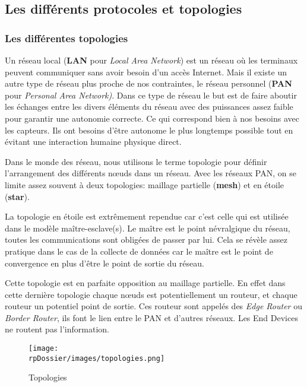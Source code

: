
\subsection{Les différents protocoles et topologies}

\subsubsection{Les différentes topologies}

Un réseau local (\textbf{LAN} pour \textit{Local Area Network}) est un réseau où les terminaux peuvent communiquer sans avoir besoin d'un accès Internet. Mais il existe un autre type de réseau plus proche de nos contraintes, le réseau personnel (\textbf{PAN} pour \textit{Personal Area Network)}. Dans ce type de réseau le but est de faire aboutir les échanges entre les divers éléments du réseau avec des puissances assez faible pour garantir une autonomie correcte. Ce qui correspond bien à nos besoins avec les capteurs. Ils ont besoins d'être autonome le plus longtemps possible tout en évitant une interaction humaine physique direct. 

Dans le monde des réseau, nous utilisons le terme topologie pour définir l'arrangement des différents nœuds dans un réseau. Avec les réseaux PAN, on se limite assez souvent à deux topologies: maillage partielle (\textbf{mesh}) et en étoile (\textbf{star}).

La topologie en étoile est extrêmement rependue car c'est celle qui est utilisée dans le modèle maître-esclave(s). Le maître est le point névralgique du réseau, toutes les communications sont obligées de passer par lui. Cela se révèle assez pratique dans le cas de la collecte de données car le maître est le point de convergence en plus d'être le point de sortie du réseau.

Cette topologie est en parfaite opposition au maillage partielle. En effet dans cette dernière topologie chaque nœuds est potentiellement un routeur, et chaque routeur un potentiel point de sortie. Ces routeur sont appelés des \textit{Edge Router} ou \textit{Border Router}, ils font le lien entre le PAN et d'autres réseaux. Les End Devices ne routent pas l'information.

\begin{figure}[h]
\begin{center}
\texttt{[image: \\rpDossier/images/topologies.png]}
\end{center}
\caption{Topologies}
\label{topologies}
\end{figure}

